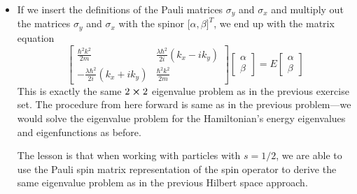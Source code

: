 \documentclass[11pt, a4paper]{article}
\newcommand{\Ham}{Hamiltonian\xspace}
\begin{document}
\begin{itemize}
	\item If we insert the definitions of the Pauli matrices $ \sigma_{y} $ and $ \sigma_{x} $ and multiply out the matrices $ \sigma_{y} $ and $ \sigma_{x} $ with the spinor $ \big[\alpha, \beta\big]^{T} $, we end up with the matrix equation
	\begin{equation*}
		\begin{bmatrix}
			\frac{\hbar^{2}k^{2}}{2m} & \frac{\lambda \hbar^{2}}{2i}(k_{x} - ik_{y})\\
			-\frac{\lambda \hbar^{2}}{2i}(k_{x} + ik_{y}) & \frac{\hbar^{2}k^{2}}{2m}
		\end{bmatrix}
		\begin{bmatrix}
			\alpha\\
			\beta
		\end{bmatrix}
		= 
		E
		\begin{bmatrix}
			\alpha\\
			\beta
		\end{bmatrix}
	\end{equation*}
	This is exactly the same $ 2 \cross 2 $ eigenvalue problem as in the previous exercise set. The procedure from here forward is same as in the previous problem---we would solve the eigenvalue problem for the \Ham's energy eigenvalues and eigenfunctions as before.
	
	The lesson is that when working with particles with $ s = 1/2 $, we are able to use the Pauli spin matrix representation of the spin operator to derive the same eigenvalue problem as in the previous Hilbert space approach.
\end{itemize}
\end{document}
